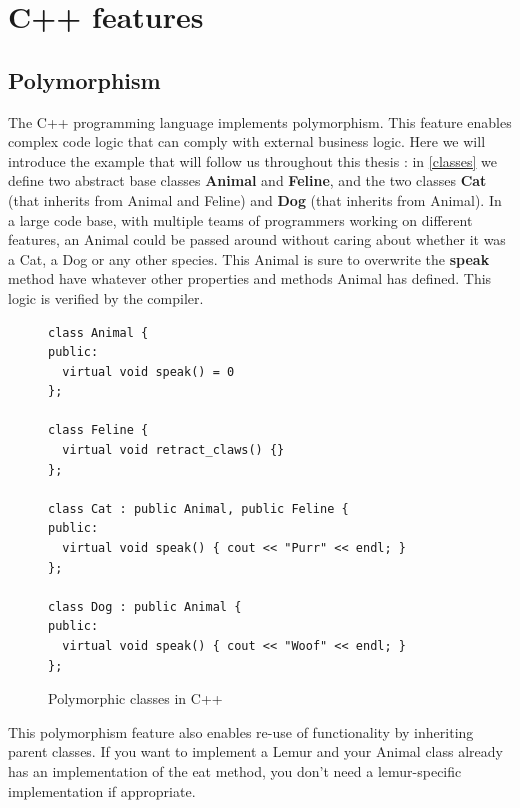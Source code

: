 \documentclass[a4paper,11pt,oneside]{report}
\begin{document}
\section{C++ features}

\subsection{Polymorphism}
\label{polymorphism}

The C++ programming language implements polymorphism.
This feature enables complex code logic that can comply with external business 
logic.
Here we will introduce the example that will follow us throughout this thesis :
in \autoref{classes} we define two abstract base classes \textbf{Animal} and 
\textbf{Feline},
and the two classes \textbf{Cat} (that inherits from Animal and Feline) and 
\textbf{Dog} (that inherits from Animal).
In a large code base, with multiple teams of programmers working on different 
features,
an Animal could be passed around without caring about whether it was a Cat, a 
Dog or any other species.
This Animal is sure to overwrite the \textbf{speak} method have whatever other 
properties and methods Animal has defined.
This logic is verified by the compiler.

\begin{figure}[h]
\begin{lstlisting}
class Animal {
public:
  virtual void speak() = 0
};

class Feline {
  virtual void retract_claws() {}
};

class Cat : public Animal, public Feline {
public:
  virtual void speak() { cout << "Purr" << endl; }
};

class Dog : public Animal {
public:
  virtual void speak() { cout << "Woof" << endl; }
};
\end{lstlisting}
\caption{Polymorphic classes in C++}
\label{classes}

\end{figure}

This polymorphism feature also enables re-use of functionality by inheriting 
parent classes.
If you want to implement a Lemur and your Animal class already has an 
implementation of the eat method,
you don't need a lemur-specific implementation if appropriate. 
\end{document}
